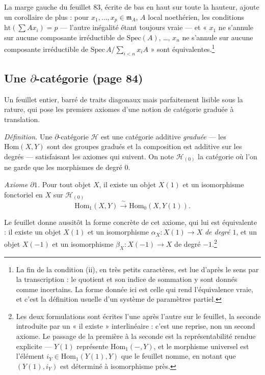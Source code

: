 \documentclass[11pt,a4paper]{article}
\begin{document}
La marge gauche du feuillet 83, écrite de bas en haut sur toute la hauteur,
ajoute un corollaire de plus : pour $x_{1},\ldots,x_{p} \in \mathfrak{m}_{A}$,
$A$ local noethérien, les conditions $\mathrm{ht}(\sum A x_{i}) = p$ — l'autre
inégalité étant toujours vraie — et « $x_{1}$ ne s'annule sur aucune composante
irréductible de $\mathrm{Spec}(A)$, …, $x_{n}$ ne s'annule sur aucune composante
irréductible de $\mathrm{Spec}\,A/\sum_{i<n} x_{i}A$ » sont
équivalentes.\footnote{La fin de la condition (ii), en très petits caractères,
est lue d'après le sens par la transcription : le quotient et son indice de
sommation y sont donnés comme incertains. La forme donnée ici est celle qui rend
l'équivalence vraie, et c'est la définition usuelle d'un système de paramètres
partiel.}

\subsection*{Une $\partial$-catégorie (page 84)}

Un feuillet entier, barré de traits diagonaux mais parfaitement lisible sous la
rature, qui pose les premiers axiomes d'une notion de catégorie graduée à
translation.

\emph{Définition.} Une $\partial$-catégorie $\mathcal{H}$ est une catégorie
additive \emph{graduée} — les $\mathrm{Hom}(X,Y)$ sont des groupes gradués et la
composition est additive sur les degrés — satisfaisant les axiomes qui suivent.
On note $\mathcal{H}_{(0)}$ la catégorie où l'on ne garde que les morphismes de
degré $0$.

\emph{Axiome $\partial 1$.} Pour tout objet $X$, il existe un objet $X(1)$ et
un isomorphisme fonctoriel en $X$ sur $\mathcal{H}_{(0)}$
\[
  \mathrm{Hom}_{1}(X, Y) \xrightarrow{\;\sim\;} \mathrm{Hom}_{0}(X, Y(1)) .
\]

Le feuillet donne aussitôt la forme concrète de cet axiome, qui lui est
équivalente : il existe un objet $X(1)$ et un isomorphisme $\alpha_{X} : X(1)
\to X$ \emph{de degré $1$}, et un objet $X(-1)$ et un isomorphisme $\beta_{X} :
X(-1) \to X$ de degré $-1$.\footnote{Les deux formulations sont écrites l'une
après l'autre sur le feuillet, la seconde introduite par un « il existe »
interlinéaire : c'est une reprise, non un second axiome. Le passage de la
première à la seconde est la représentabilité rendue explicite — $Y(1)$
représente $\mathrm{Hom}_{1}(-, Y)$, et le morphisme universel est l'élément
$i_{Y} \in \mathrm{Hom}_{1}(Y(1), Y)$ que le feuillet nomme, en notant que
$(Y(1), i_{Y})$ est déterminé à isomorphisme près.}
\end{document}
